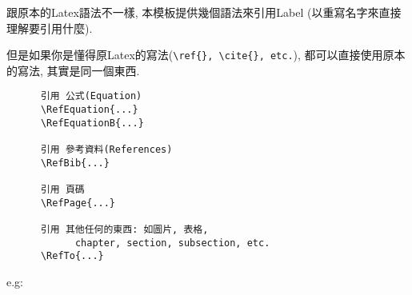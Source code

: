  跟原本的Latex語法不一樣, 本模板提供幾個語法來引用Label (以重寫名字來直接理解要引用什麼).

  但是如果你是懂得原Latex的寫法(\verb|\ref{}, \cite{}, etc.|), 都可以直接使用原本的寫法, 其實是同一個東西.

    \begin{framed}
    \begin{verbatim}
      引用 公式(Equation)
      \RefEquation{...}
      \RefEquationB{...}

      引用 參考資料(References)
      \RefBib{...}

      引用 頁碼
      \RefPage{...}

      引用 其他任何的東西: 如圖片, 表格,
            chapter, section, subsection, etc.
      \RefTo{...}
    \end{verbatim}
    \end{framed}

    e.g:

\EndChapter
